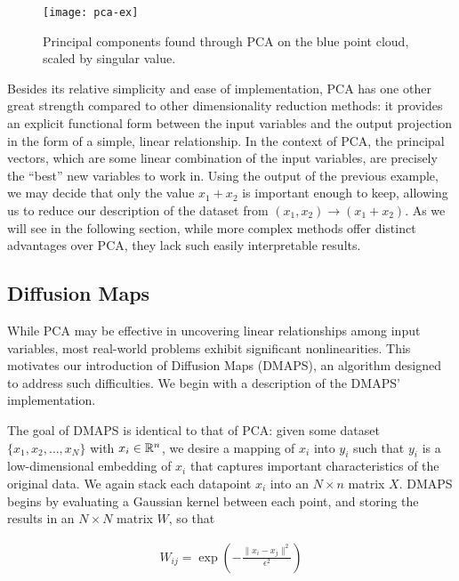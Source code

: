 \begin{figure}
  \centering
  \texttt{[image: pca-ex]}
  \caption{Principal components found through PCA on the blue point
    cloud, scaled by singular value. \label{fig:pca-ex}}
\end{figure}

Besides its relative simplicity and ease of implementation, PCA has
one other great strength compared to other dimensionality reduction
methods: it provides an explicit functional form between the input
variables and the output projection in the form of a simple, linear
relationship. In the context of PCA, the principal vectors, which are
some linear combination of the input variables, are precisely the
``best'' new variables to work in. Using the output of the previous
example, we may decide that only the value $x_1 + x_2$ is important
enough to keep, allowing us to reduce our description of the dataset
from $(x_1, x_2) \rightarrow (x_1 + x_2)$. As we will see in the
following section, while more complex methods offer distinct
advantages over PCA, they lack such easily interpretable results.

\subsection{Diffusion Maps \label{sec:dmaps}}

While PCA may be effective in uncovering linear relationships among
input variables, most real-world problems exhibit significant
nonlinearities. This motivates our introduction of Diffusion Maps
(DMAPS), an algorithm designed to address such difficulties. We begin
with a description of the DMAPS' implementation.

The goal of DMAPS is identical to that of PCA: given some dataset
$\{x_1, x_2, \hdots, x_N \}$ with $x_i \in \mathbb{R}^n$, we desire a mapping
of $x_i$ into $y_i$ such that $y_i$ is a low-dimensional embedding of
$x_i$ that captures important characteristics of the original data. We
again stack each datapoint $x_i$ into an $N \times n$ matrix
$X$. DMAPS begins by evaluating a Gaussian kernel between each point,
and storing the results in an $N \times N$ matrix $W$, so that

\begin{align}
  W_{ij} = \exp \left( -\frac{\|x_i - x_j\|^2}{\epsilon^2} \right)
\end{align}

